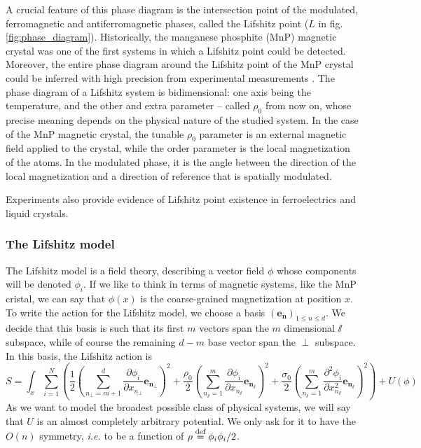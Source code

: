 A crucial feature of this phase diagram is the intersection point of the modulated, ferromagnetic and antiferromagnetic phases, called the Lifshitz point ($L$ in fig. \eqref{fig:phase_diagram}). 
Historically, the manganese phosphite (MnP) magnetic crystal was one of the first systems in which a Lifshitz point could be detected. Moreover, the entire phase diagram around the Lifshitz point of the MnP crystal could be inferred with high precision from experimental measurements \cite{MnP}.
The phase diagram of a Lifshitz system is bidimensional: one axis being the temperature, and the other and extra parameter -- called $\rho_0$ from now on, whose precise meaning depends on the physical nature of the studied system.
In the case of the MnP magnetic crystal, the tunable $\rho_0$ parameter is an external magnetic field applied to the crystal, while the order parameter  is the local magnetization of the atoms. In the modulated phase, it is the angle between the direction of the local magnetization and a direction of reference that is spatially modulated.

Experiments also provide evidence of Lifshitz point existence in ferroelectrics and liquid crystals.

\subsubsection{The Lifshitz model}

The Lifshitz model is a field theory, describing a vector field $\phi$ whose components will be denoted $\phi_i$.
If we like to think in terms of magnetic systems, like the MnP cristal, we can say that $\phi(x)$ is the coarse-grained magnetization at position $x$.
 To write the action for the Lifshitz model, we choose a basis $(\mathbf{e_n})_{1 \leq n \leq d}$. We decide that this basis is such that its first $m$ vectors span the $m$ dimensional $\sslash$ subspace, while of course the remaining $d-m$ base vector span the $\perp$ subspace. In this basis, the Lifshitz action is
\begin{equation}
S = \int_x \sum_{i=1}^N \left( \frac{1}{2} \left(\sum_{n_\perp=m+1}^{d}\frac{\partial \phi_i}{\partial x_{n_\perp}} \mathbf{e_{n_\perp}}\right)^2 + \frac{\rho_0}{2} \left(\sum_{n_\sslash=1}^{m}\frac{\partial \phi_i}{\partial x_{n_\sslash}} \mathbf{e_{n_\sslash}}\right)^2 + \frac{\sigma_0}{2} \left(\sum_{n_\sslash=1}^{m} \frac{\partial^2 \phi_i}{\partial x_{n_\sslash}^2} \mathbf{e_{n_\sslash}}\right)^2 \right) + U(\phi)
\end{equation}
As we want to model the broadest possible class of physical systems, we will say that $U$ is an almost completely arbitrary potential. We only ask for it to have the $O(n)$ symmetry, \textit{i.e.} to be a function of $\rho  \overset{\text{def}}{=}  \phi_i \phi_i/2$.

